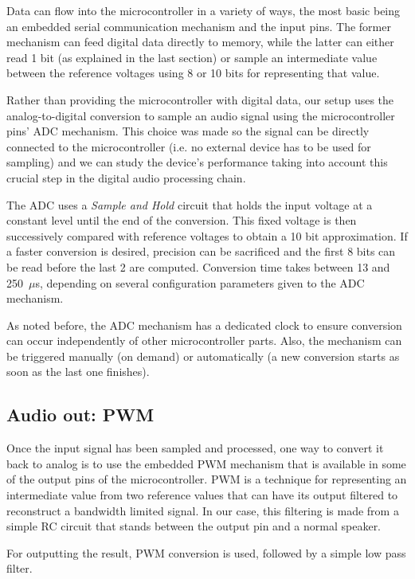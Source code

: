 Data can flow into the microcontroller in a variety of ways, the most basic
being an embedded serial communication mechanism and the input pins. The
former mechanism can feed digital data directly to memory, while the latter
can either read 1 bit (as explained in the last section) or sample an
intermediate value between the reference voltages using 8 or 10 bits for
representing that value.

Rather than providing the microcontroller with digital data, our setup uses
the analog-to-digital conversion to sample an audio signal using the
microcontroller pins' ADC mechanism. This choice was made so the signal can be
directly connected to the microcontroller (i.e. no external device has to be
used for sampling) and we can study the device's performance taking into
account this crucial step in the digital audio processing chain.

The ADC uses a \emph{Sample and Hold} circuit that holds the input voltage
at a constant level until the end of the conversion. This fixed voltage is
then successively compared with reference voltages to obtain a 10 bit
approximation. If a faster conversion is desired, precision can be sacrificed
and the first 8 bits can be read before the last 2 are computed. Conversion
time takes between 13 and 250~$\mu$s, depending on several configuration
parameters given to the ADC mechanism.

As noted before, the ADC mechanism has a dedicated clock to ensure conversion
can occur independently of other microcontroller parts. Also, the mechanism
can be triggered manually (on demand) or automatically (a new conversion
starts as soon as the last one finishes).

\subsection{Audio out: PWM}
\label{sec:pwm}

Once the input signal has been sampled and processed, one way to convert
it back to analog is to use the embedded PWM mechanism that is available in
some of the output pins of the microcontroller. PWM is a technique for
representing an intermediate value from two reference values that can have its
output filtered to reconstruct a bandwidth limited signal. In our case, this
filtering is made from a simple RC circuit that stands between the output pin
and a normal speaker.

For outputting the result, PWM conversion is used, followed by a simple
low pass filter.

